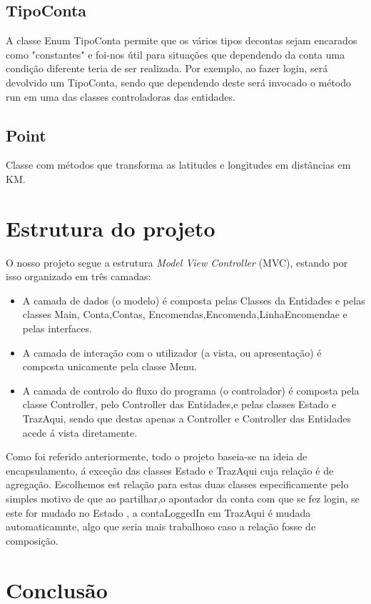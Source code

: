 \documentclass[a4paper]{report}
\begin{document}
	 \section{TipoConta}
	 A classe Enum TipoConta permite que os vários tipos decontas sejam encarados como "constantes" e foi-nos útil para situações que dependendo da conta uma condição diferente teria de ser realizada. Por exemplo, ao fazer login, será devolvido um TipoConta, sendo que dependendo deste será invocado o método run em uma das classes controladoras das entidades.
	 
	\section{Point}
	Classe com métodos que transforma as latitudes e longitudes em distâncias em KM.
	\chapter{Estrutura do projeto}
	
	O nosso projeto segue a estrutura \textit{Model View Controller} (MVC), estando por isso organizado em três camadas:
	\begin{itemize}
		\item A camada de dados (o modelo) é composta pelas Classes da Entidades e pelas classes Main, Conta,Contas, Encomendas,Encomenda,LinhaEncomendae e pelas interfaces.
		\item A camada de interação com o utilizador (a vista, ou apresentação) é composta unicamente pela classe Menu.
		\item A camada de controlo do fluxo do programa (o controlador) é composta pela classe Controller, pelo Controller das Entidades,e pelas classes Estado e TrazAqui, sendo que destas apenas a Controller e Controller das Entidades acede á vista diretamente.
	\end{itemize}
      Como foi referido anteriormente, todo o projeto baseia-se na ideia de encapsulamento, á exceção das classes Estado e TrazAqui cuja relação é de agregação. Escolhemos est relação para estas duas classes especificamente pelo simples motivo de que ao partilhar,o apontador da conta com que se fez login, se este for mudado no Estado , a contaLoggedIn em TrazAqui é mudada automaticamnte, algo que seria mais trabalhoso caso a relação fosse de composição.
      

	
	

	\chapter{Conclusão}
\end{document}
